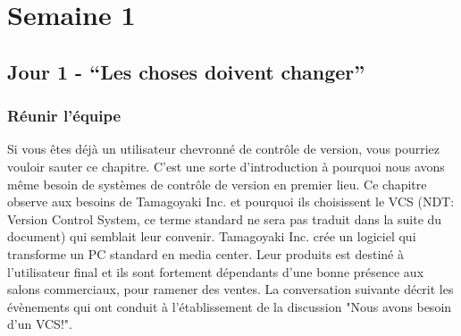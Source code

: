 \chapter{Semaine 1}
\section{Jour 1 - ``Les choses doivent changer''}
\subsection{Réunir l'équipe}
Si vous êtes déjà un utilisateur chevronné de contrôle de version, vous pourriez vouloir sauter ce chapitre.
C'est une sorte d'introduction à pourquoi nous avons même besoin de systèmes de contrôle de version en premier lieu.
Ce chapitre observe aux besoins de Tamagoyaki Inc. et pourquoi ils choisissent le VCS (NDT: Version Control System, ce terme standard ne sera pas traduit dans la suite du document) qui semblait leur convenir.
Tamagoyaki Inc. crée un logiciel qui transforme un PC standard en media center.
Leur produits est destiné à l'utilisateur final et ils sont fortement dépendants d'une bonne présence aux salons commerciaux, pour ramener des ventes.
La conversation suivante décrit les évènements qui ont conduit à l'établissement de la discussion "Nous avons besoin d'un VCS!".

